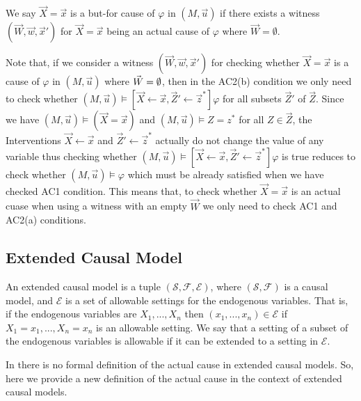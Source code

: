 \begin{definition}
    We say $\vec X = \vec x$ is a but-for cause of $\varphi$ in
    $(M,\vec u)$ if there exists a witness $(\vec W, \vec w, \vec x')$
    for $\vec X = \vec x$ being an actual cause of $\varphi$
    where $\vec W = \emptyset $.
\end{definition}

Note that, if we consider a witness $(\vec W, \vec w, \vec x')$
for checking whether $\vec X = \vec x$ is a cause of $\varphi$
in $(M,\vec u)$ where $\vec W = \emptyset$, then in the AC2(b) condition
we only need to check whether $(M,\vec u) \vDash [\vec X \leftarrow \vec x, \vec Z' \leftarrow \vec z^*]\varphi$ for all subsets $\vec Z'$
of $\vec Z$.
Since we have $(M,\vec u) \vDash (\vec X = \vec x)$ and
$(M,\vec u) \vDash Z = z^*$ for all $Z \in \vec Z$,
the Interventions $\vec X \leftarrow \vec x$ and
$\vec Z ' \leftarrow \vec z^*$ actually do not change the value of
any variable thus checking whether
$(M,\vec u) \vDash [\vec X \leftarrow \vec x, \vec Z' \leftarrow \vec z^*]\varphi$ is true
reduces to check whether $(M,\vec u) \vDash \varphi$
which must be already satisfied when we have checked AC1 condition.
This means that, to check whether $\vec X = \vec x$ is an actual cuase when using a witness with an empty $\vec W$
we only need to check AC1 and AC2(a) conditions.
\subsection{Extended Causal Model}
An extended causal model is a tuple $(\mathcal{S},\mathcal{F},
    \mathcal{E})$, where $(\mathcal{S},\mathcal{F})$ is a causal model, and $\mathcal{E}$ is a set of allowable settings for the endogenous variables.
That is, if the endogenous variables are $X_1,...,X_n$ then
$(x_1,...,x_n) \in \mathcal{E}$ if $X_1 = x_1, ..., X_n=x_n$ is an
allowable setting.
We say that a setting of a subset of the endogenous variables is allowable if it can be extended to a setting in $\mathcal{E}$.

In \cite{hp} there is no formal definition of the actual cause
in extended causal models.
So, here we provide a new definition of the actual cause
in the context of extended causal models.


